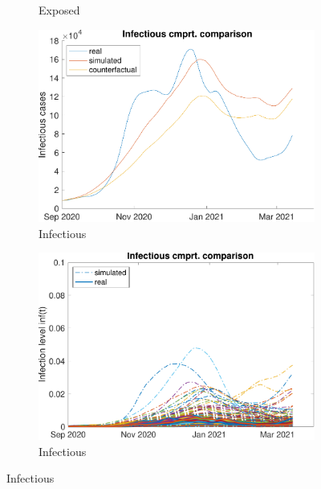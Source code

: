 \begin{figure}[hbtp]
\begin{subfigure}[b]{.45\linewidth}
         \caption{Exposed}
         \label{fig:compCombWave2Exp}
     \end{subfigure}
     \newline
     \begin{subfigure}[b]{.45\linewidth}
         \centering
         \includegraphics[width=\linewidth]{img/210907_223108_combined_wave2/figures/COMP_inf}
         \caption{Infectious}
         \label{fig:compAggrCombWave2Inf}
     \end{subfigure}
     \hfill
     \begin{subfigure}[b]{.45\linewidth}
         \centering
         \includegraphics[width=\linewidth]{img/210907_223108_combined_wave2/figures/SEIR_i_sim-vs-real}
         \caption{Infectious}
         \label{fig:compCombWave2Inf}
     \end{subfigure}
     \newline

\end{figure}
